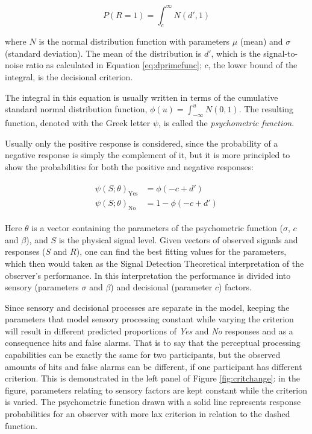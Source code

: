 \documentclass{article}\usepackage{knitr}
\begin{document}
\begin{equation}
\label{eq:SDTintegral}
P(R = 1) = \int_{c}^{\infty} N(d', 1)
\end{equation}

where $N$ is the normal distribution function with parameters $\mu$ (mean) and $\sigma$ (standard deviation). The mean of the distribution is $d'$, which is the signal-to-noise ratio as calculated in Equation \ref{eq:dprimefunc}; $c$, the lower bound of the integral, is the decisional criterion. 

The integral in this equation is usually written in terms of the cumulative standard normal distribution function, $\phi(u) = \int_{-\infty}^{u} N(0, 1)$. The resulting function, denoted with the Greek letter $\psi$, is called the \textit{psychometric function}. \cite[Chapter 4]{kingdomprins2010}

Usually only the positive response is considered, since the probability of a negative response is simply the complement of it, but it is more principled to show the probabilities for both the positive and negative responses:

\begin{align*}
\begin{split}
\psi(S; \theta)_{\text{Yes}} &= \phi(-c + d') \\
\psi(S; \theta)_{\text{No}} &=  1 - \phi(-c + d')
\end{split}
\end{align*}

Here $\theta$ is a vector containing the parameters of the psychometric function ($\sigma$, $c$ and $\beta$), and $S$ is the physical signal level. Given vectors of observed signals and responses ($S$ and $R$), one can find the best fitting values for the parameters, which then would taken as the Signal Detection Theoretical interpretation of the observer's performance. In this interpretation the performance is divided into sensory (parameters $\sigma$ and $\beta$) and decisional (parameter $c$) factors.

Since sensory and decisional processes are separate in the model, keeping the parameters that model sensory processing constant while varying the criterion will result in different predicted proportions of \textit{Yes} and \textit{No} responses and as a consequence hits and false alarms. That is to say that the perceptual processing capabilities can be exactly the same for two participants, but the observed amounts of hits and false alarms can be different, if one participant has different criterion. This is demonstrated in the left panel of Figure \ref{fig:critchange}: in the figure, parameters relating to sensory factors are kept constant while the criterion is varied. The psychometric function drawn with a solid line represents response probabilities for an observer with more lax criterion in relation to the dashed function.
\end{document}
